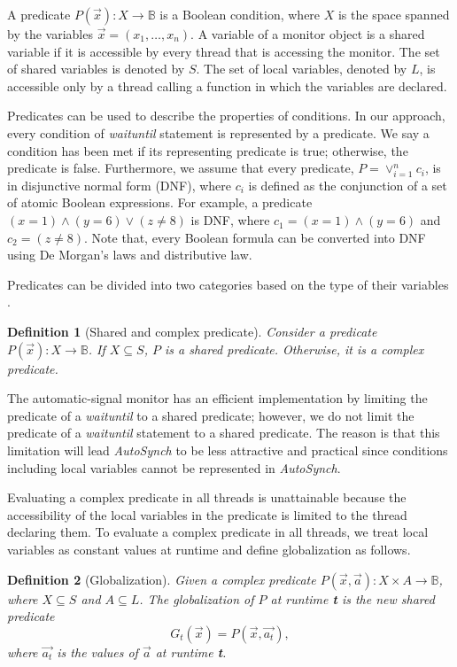 \documentclass[preprint]{sigplanconf}
\newtheorem{definition}{Definition}
\begin{document}
A predicate $P(\vec{x}): X \rightarrow \mathbb{B}$ is a Boolean condition, 
where $X$ is the space spanned by the variables $\vec{x}=(x_1, \dots, x_n)$. 
A variable of a monitor object is a shared variable if it is accessible by every 
thread that is accessing the monitor. The set of shared variables is denoted by 
$S$. The set of local variables, denoted by $L$, is 
accessible only by a thread calling a function in which the variables are declared. 

Predicates can be used to describe the properties of conditions. In our
approach,
every condition of {\em waituntil} statement is represented by a predicate. We say
a condition has been met if its representing predicate is true; otherwise, the
predicate is false. 
Furthermore, we assume that every predicate, $P = \vee_{i=1}^nc_i$, is in 
disjunctive normal form (DNF), where $c_i$ is defined as the conjunction of a 
set of atomic Boolean expressions. For example, a predicate $(x = 1) \wedge 
(y = 6) \vee (z \ne 8)$ is DNF, where $c_1 = (x = 1) \wedge (y = 6)$ and $c_2 = 
(z \ne 8)$. Note that, every Boolean formula can be converted into DNF using 
De Morgan's laws and distributive law. 

Predicates can be divided into two categories based on the type of their 
variables \cite{bh05}.
\begin{definition}[Shared and complex predicate]
    Consider a predicate $P(\vec{x}): X \rightarrow \mathbb{B}$. If $X 
    \subseteq S$, $P$ 
    is a shared predicate. Otherwise, it
    is a complex predicate. 
\end{definition}

The automatic-signal monitor has an efficient implementation \cite{kes77} by 
limiting the predicate of a {\em waituntil} to a shared predicate; however, 
we do not limit the predicate of a {\em waituntil} statement to a shared
predicate. The reason is that this limitation will lead {\em AutoSynch} to be less
attractive and practical since conditions including local variables cannot be 
represented in {\em AutoSynch}.

Evaluating a complex predicate in all threads is unattainable 
because the accessibility of the local variables in the predicate is limited 
to the thread declaring them. To evaluate a complex predicate in all 
threads, we treat local variables as constant values at runtime and define 
globalization as follows. 
\begin{definition}[Globalization]
    Given a complex predicate $P(\vec{x}, \vec{a}): X \times A \rightarrow 
    \mathbb{B}$, where $X \subseteq S$ and $A \subseteq L$. The globalization 
    of $P$ at runtime {\textbf t} is the new shared predicate
    \[
    G_t(\vec{x}) = P(\vec{x}, \vec{a_t}),
    \]
    where $\vec{a_t}$ is the values of $\vec{a}$ at runtime {\textbf t}. 
\end{definition}
\end{document}
